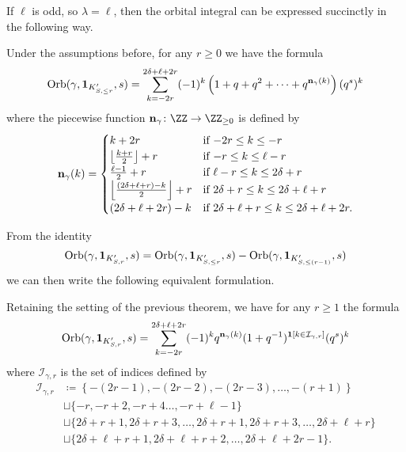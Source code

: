 If $\ell$ is odd, so $\lambda = \ell$, then
the orbital integral can be expressed succinctly in the following way.
\begin{theorem}
  Under the assumptions before, for any $r \ge 0$ we have the formula
  \[
    \operatorname{Orb}(\gamma, \mathbf{1}_{K'_{S, \le r}}, s)
    = \sum_{k = -2r}^{2\delta + \ell + 2r}
    (-1)^k \left( 1 + q + q^2 + \dots + q^{\mathbf n_{\gamma}(k)}  \right) (q^s)^k
  \]
  where the piecewise function $\nn_\gamma \colon \ZZ \to \ZZ_{\ge 0}$ is defined by
  \[
    \mathbf n_\gamma(k) =
    \begin{cases}
      k + 2r & \text{if } {-2r} \le k \le -r \\
      \left\lfloor \frac{k+r}{2} \right\rfloor + r & \text{if }{-r} \le k \le \ell-r \\
      \frac{\ell-1}{2} + r & \text{if } \ell - r \le k \le 2\delta + r \\
      \left\lfloor \frac{(2\delta+\ell+r)-k}{2} \right\rfloor + r & \text{if } 2\delta + r \le k \le 2\delta + \ell + r\\
      (2\delta + \ell + 2r) - k & \text{if } 2\delta + \ell + r \le k \le 2\delta + \ell + 2r.
    \end{cases}
  \]
\end{theorem}
From the identity
\[
  \operatorname{Orb}(\gamma, \mathbf{1}_{K'_{S, r}}, s)
  = \operatorname{Orb}(\gamma, \mathbf{1}_{K'_{S, \le r}}, s)
  - \operatorname{Orb}(\gamma, \mathbf{1}_{K'_{S, \le (r-1)}}, s)
\]
we can then write the following equivalent formulation.
\begin{theorem}
  Retaining the setting of the previous theorem, we have for any $r \ge 1$ the formula
  \[
    \operatorname{Orb}(\gamma, \mathbf{1}_{K'_{S, r}}, s)
    = \sum_{k = -2r}^{2\delta + \ell + 2r}
    (-1)^k q^{\mathbf n_{\gamma}(k)}
    (1+q^{-1})^{\mathbf{1}[k \in \mathcal I_{\gamma, r}]}
    (q^s)^k
  \]
  where $\mathcal I_{\gamma, r}$ is the set of indices defined by
  \begin{align*}
    \mathcal{I}_{\gamma, r}
    &\coloneqq \left\{ -(2r-1), -(2r-2), -(2r-3), \dots, -(r+1) \right\} \\
    &\sqcup \{-r, -r+2, -r+4 \dots, -r+\ell-1 \} \\
    &\sqcup \{ 2\delta+r+1, 2\delta+r+3, \dots, 2\delta+r+1, 2\delta+r+3, \dots, 2\delta+\ell+r \} \\
    &\sqcup \{ 2\delta+\ell+r+1, 2\delta+\ell+r+2, \dots, 2\delta+\ell+2r-1 \}.
  \end{align*}
\end{theorem}

